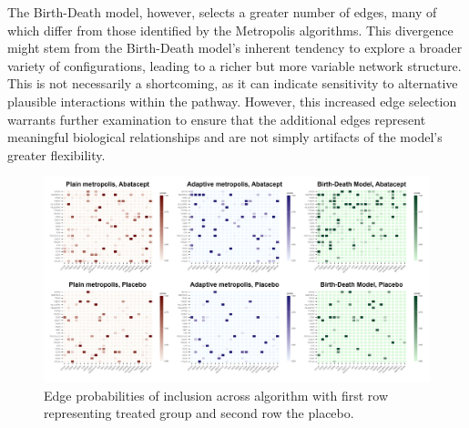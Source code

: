 \documentclass{report}
\begin{document}
	The Birth-Death model, however, selects a greater number of edges, many of which differ from those identified by the Metropolis algorithms. This divergence might stem from the Birth-Death model's inherent tendency to explore a broader variety of configurations, leading to a richer but more variable network structure. This is not necessarily a shortcoming, as it can indicate sensitivity to alternative plausible interactions within the pathway. However, this increased edge selection warrants further examination to ensure that the additional edges represent meaningful biological relationships and are not simply artifacts of the model's greater flexibility.
	
	\begin{figure}[ht] 
		\centering
		\includegraphics[width=1\textwidth]{Figures/Application/analysis/edgeprobs_treatm_placebo.png}
		\caption{Edge probabilities of inclusion across algorithm with first row representing treated group and second row the placebo.}
		\label{fig:edge-probabilties}
	\end{figure}
	
\end{document}
